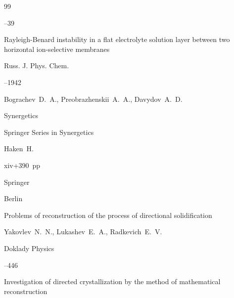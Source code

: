 \begin{thebibliography}{99}

--39






\paper Rayleigh-Benard instability in a flat electrolyte solution layer between two horizontal ion-selective membranes


\jour Russ. J. Phys. Chem.



--1942

\by  Bograchev~D.~A., Preobrazhenskii~A.~A.,  Davydov~A.~D.







\book Synergetics


\serial Springer Series in Synergetics


\by Haken~H.

\totalpages xiv+390~pp \nofrills


\publaddr Springer

\publ Berlin






\paper Problems of reconstruction of the process of directional solidification

\by Yakovlev~N.~N., Lukashev~E.~A., Radkevich~E.~V.

\jour Doklady Physics




--446










\paper Investigation of directed crystallization by the method of mathematical reconstruction


\end{thebibliography}
